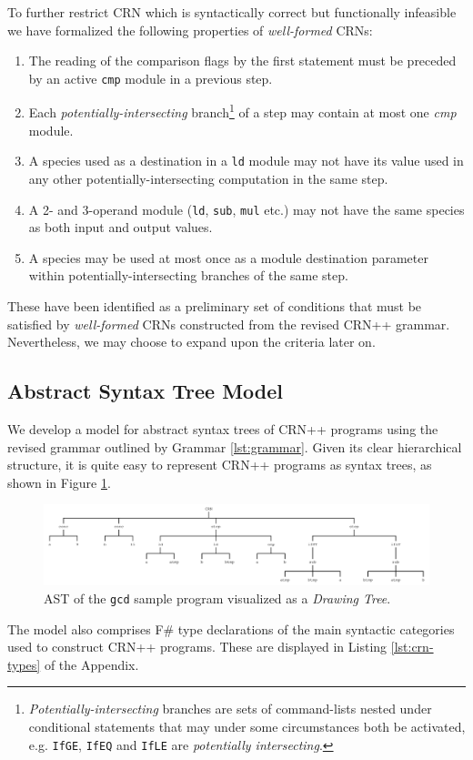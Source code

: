 To further restrict CRN which is syntactically correct but functionally infeasible we have formalized the following properties of \textit{well-formed} CRNs:
\begin{enumerate}
    \item The reading of the comparison flags by the first  statement must be preceded by an active \texttt{cmp} module in a previous step. \label{prop:initCmp}
    \item Each \textit{potentially-intersecting} branch\footnote{\textit{Potentially-intersecting} branches are sets of command-lists nested under conditional statements that may under some circumstances both be activated, e.g. \texttt{IfGE}, \texttt{IfEQ} and \texttt{IfLE} are \textit{potentially intersecting}.} of a step may contain at most one \textit{cmp} module. \label{prop:singleCmp}
    \item A species used as a destination in a \texttt{ld} module may not have its value used in any other potentially-intersecting computation in the same step. \label{prop:noLoadUse}
    \item A 2- and 3-operand module (\texttt{ld}, \texttt{sub}, \texttt{mul} etc.) may not have the same species as both input and output values. \label{prop:notSameIO}
    \item A species may be used at most once as a module destination parameter within potentially-intersecting branches of the same step. \label{prop:singleAssign}
\end{enumerate}
These have been identified as a preliminary set of conditions that must be satisfied by \textit{well-formed} CRNs constructed from the revised CRN++ grammar. Nevertheless, we may choose to expand upon the criteria later on. 

\subsection{Abstract Syntax Tree Model} %
We develop a model for abstract syntax trees of CRN++ programs using the revised grammar outlined by Grammar \ref{lst:grammar}. Given its clear hierarchical structure, it is quite easy to represent CRN++ programs as syntax trees, as shown in Figure \ref{fig:ast}.
\begin{figure}[H]
    \centering
    \includegraphics[width=\textwidth]{Figures/gcd-tree.pdf}
    \caption{AST of the \texttt{gcd} sample program visualized as a \textit{Drawing Tree}.}
    \label{fig:ast}
\end{figure}
The model also comprises F\# type declarations of the main syntactic categories used to construct CRN++ programs. These are displayed in Listing \ref{lst:crn-types} of the Appendix.

